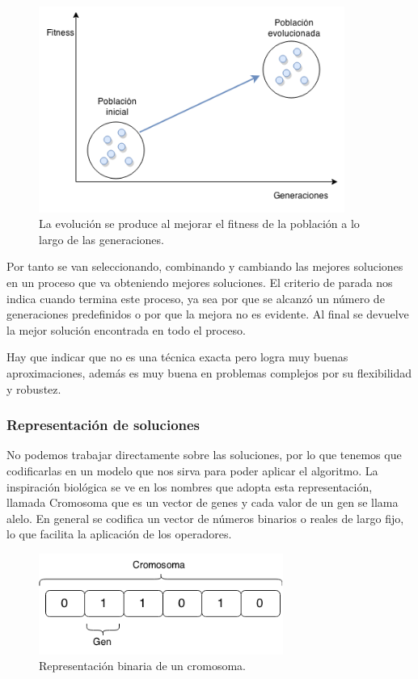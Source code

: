 \begin{figure}[H]
	\centering
	\includegraphics[width=10cm]{Figures/fitness_generaciones}
	\caption{La evolución se produce al mejorar el fitness de la población a lo largo de las generaciones.}
	\label{fig:fitness_generaciones}
\end{figure}



Por tanto se van seleccionando, combinando y cambiando las mejores soluciones en un proceso que va obteniendo mejores soluciones.
El criterio de parada nos indica cuando termina este proceso, ya sea por que se alcanzó un número de generaciones predefinidos o por que la mejora no es evidente. Al final se devuelve la mejor solución encontrada en todo el proceso.

Hay que indicar que no es una técnica exacta pero logra muy buenas aproximaciones, además es muy buena en problemas complejos por su flexibilidad y robustez. 


\subsubsection{Representación de soluciones}
No podemos trabajar directamente sobre las soluciones, por lo que tenemos que codificarlas en un modelo que nos sirva para poder aplicar el algoritmo.
La inspiración biológica se ve en los nombres que adopta esta representación, llamada Cromosoma que es un vector de genes y cada valor de un gen se llama alelo.
En general se codifica un vector de números binarios o reales de largo fijo, lo que facilita la aplicación de los operadores.

\begin{figure}[H]
	\centering
	\includegraphics[width=8cm]{Figures/rep_binaria}
	\caption{Representación binaria de un cromosoma.}
	\label{fig:rep_binaria}
\end{figure}


